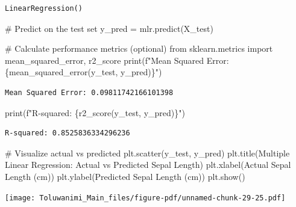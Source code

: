 \documentclass[
  letterpaper,
  DIV=11,
  numbers=noendperiod]{scrreprt}
\newenvironment{Shaded}{\begin{snugshade}}{\end{snugshade}}
\newcommand{\BuiltInTok}[1]{\textcolor[rgb]{0.00,0.23,0.31}{#1}}
\newcommand{\CommentTok}[1]{\textcolor[rgb]{0.37,0.37,0.37}{#1}}
\newcommand{\ImportTok}[1]{\textcolor[rgb]{0.00,0.46,0.62}{#1}}
\newcommand{\NormalTok}[1]{\textcolor[rgb]{0.00,0.23,0.31}{#1}}
\newcommand{\OperatorTok}[1]{\textcolor[rgb]{0.37,0.37,0.37}{#1}}
\newcommand{\SpecialCharTok}[1]{\textcolor[rgb]{0.37,0.37,0.37}{#1}}
\newcommand{\SpecialStringTok}[1]{\textcolor[rgb]{0.13,0.47,0.30}{#1}}
\newcommand{\StringTok}[1]{\textcolor[rgb]{0.13,0.47,0.30}{#1}}
\begin{document}
\begin{verbatim}
LinearRegression()
\end{verbatim}

\begin{Shaded}
\begin{Highlighting}[]
\CommentTok{\# Predict on the test set}
\NormalTok{y\_pred }\OperatorTok{=}\NormalTok{ mlr.predict(X\_test)}

\CommentTok{\# Calculate performance metrics (optional)}
\ImportTok{from}\NormalTok{ sklearn.metrics }\ImportTok{import}\NormalTok{ mean\_squared\_error, r2\_score}
\BuiltInTok{print}\NormalTok{(}\SpecialStringTok{f"Mean Squared Error: }\SpecialCharTok{\{}\NormalTok{mean\_squared\_error(y\_test, y\_pred)}\SpecialCharTok{\}}\SpecialStringTok{"}\NormalTok{)}
\end{Highlighting}
\end{Shaded}

\begin{verbatim}
Mean Squared Error: 0.09811742166101398
\end{verbatim}

\begin{Shaded}
\begin{Highlighting}[]
\BuiltInTok{print}\NormalTok{(}\SpecialStringTok{f"R{-}squared: }\SpecialCharTok{\{}\NormalTok{r2\_score(y\_test, y\_pred)}\SpecialCharTok{\}}\SpecialStringTok{"}\NormalTok{)}
\end{Highlighting}
\end{Shaded}

\begin{verbatim}
R-squared: 0.8525836334296236
\end{verbatim}

\begin{Shaded}
\begin{Highlighting}[]
\CommentTok{\# Visualize actual vs predicted}
\NormalTok{plt.scatter(y\_test, y\_pred)}
\NormalTok{plt.title(}\StringTok{\textquotesingle{}Multiple Linear Regression: Actual vs Predicted Sepal Length\textquotesingle{}}\NormalTok{)}
\NormalTok{plt.xlabel(}\StringTok{\textquotesingle{}Actual Sepal Length (cm)\textquotesingle{}}\NormalTok{)}
\NormalTok{plt.ylabel(}\StringTok{\textquotesingle{}Predicted Sepal Length (cm)\textquotesingle{}}\NormalTok{)}
\NormalTok{plt.show()}
\end{Highlighting}
\end{Shaded}

\texttt{[image: Toluwanimi\_Main\_files/figure-pdf/unnamed-chunk-29-25.pdf]}
\end{document}
